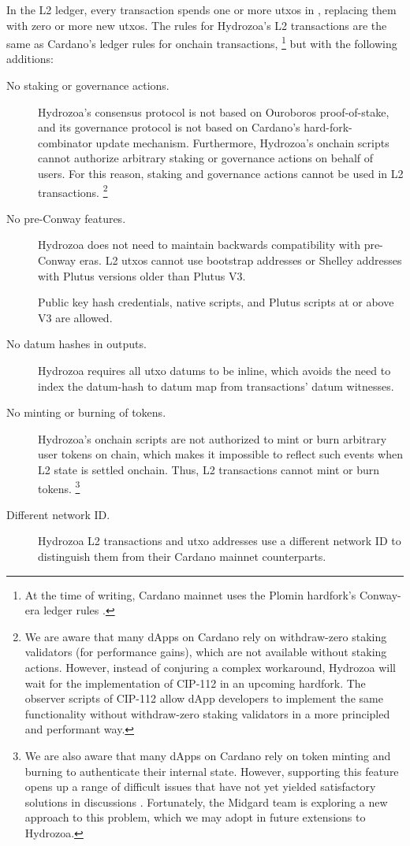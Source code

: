 \documentclass[../hydrozoa.tex]{subfiles}
\begin{document}
In the L2 ledger, every transaction spends one or more utxos in , replacing them with zero or more new utxos.
The rules for Hydrozoa's L2 transactions are the same as Cardano's ledger rules for onchain transactions,%
\footnote{At the time of writing, Cardano mainnet uses the Plomin hardfork's Conway-era ledger rules \citep{IntersectMBOCardanoLedgerV117402025}.}
but with the following additions:
\begin{description}
    \item[No staking or governance actions.]
      Hydrozoa's consensus protocol is not based on Ouroboros proof-of-stake, and its governance protocol is not based on Cardano's hard-fork-combinator update mechanism.
      Furthermore, Hydrozoa's onchain scripts cannot authorize arbitrary staking or governance actions on behalf of users.
      For this reason, staking and governance actions cannot be used in L2 transactions.%
      \footnote{We are aware that many dApps on Cardano rely on withdraw-zero staking validators (for performance gains), which are not available without staking actions.
        However, instead of conjuring a complex workaround, Hydrozoa will wait for the implementation of CIP-112 \citep{DiSarroCIP112ObserveScript2024} in an upcoming hardfork.
        The observer scripts of CIP-112 allow dApp developers to implement the same functionality without withdraw-zero staking validators in a more principled and performant way.}
    \item[No pre-Conway features.] Hydrozoa does not need to maintain backwards compatibility with pre-Conway eras.
      L2 utxos cannot use bootstrap addresses or Shelley addresses with Plutus versions older than Plutus V3.

      Public key hash credentials, native scripts, and Plutus scripts at or above V3 are allowed.
    \item[No datum hashes in outputs.] Hydrozoa requires all utxo datums to be inline, which avoids the need to index the datum-hash to datum map from transactions' datum witnesses.
    \item[No minting or burning of tokens.]
      Hydrozoa's onchain scripts are not authorized to mint or burn arbitrary user tokens on chain, which makes it impossible to reflect such events when L2 state is settled onchain.
      Thus, L2 transactions cannot mint or burn tokens.%
      \footnote{We are also aware that many dApps on Cardano rely on token minting and burning to authenticate their internal state.
        However, supporting this feature opens up a range of difficult issues that have not yet yielded satisfactory solutions in discussions \citep{IOGExcludePhantomTokens2025}.
        Fortunately, the Midgard team is exploring a new approach to this problem, which we may adopt in future extensions to Hydrozoa.}
    \item[Different network ID.] Hydrozoa L2 transactions and utxo addresses use a different network ID to distinguish them from their Cardano mainnet counterparts.
\end{description}
\end{document}
